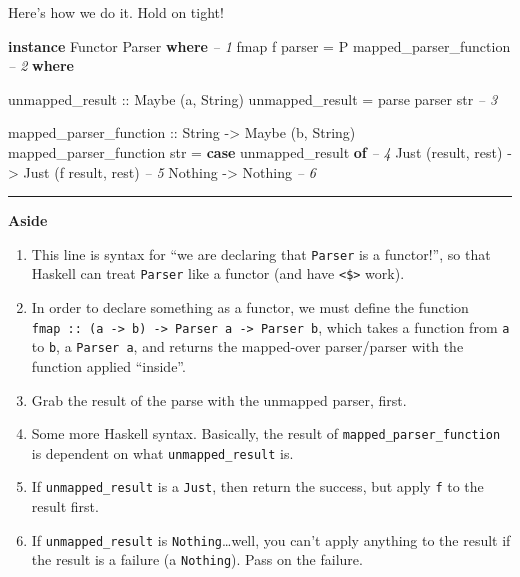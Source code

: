 \documentclass[]{article}
\newenvironment{Shaded}{}{}
\newcommand{\KeywordTok}[1]{\textcolor[rgb]{0.00,0.44,0.13}{\textbf{{#1}}}}
\newcommand{\DataTypeTok}[1]{\textcolor[rgb]{0.56,0.13,0.00}{{#1}}}
\newcommand{\CommentTok}[1]{\textcolor[rgb]{0.38,0.63,0.69}{\textit{{#1}}}}
\newcommand{\OtherTok}[1]{\textcolor[rgb]{0.00,0.44,0.13}{{#1}}}
\newcommand{\FunctionTok}[1]{\textcolor[rgb]{0.02,0.16,0.49}{{#1}}}
\newcommand{\NormalTok}[1]{{#1}}
\begin{document}
Here's how we do it. Hold on tight!

\begin{Shaded}
\begin{Highlighting}[]
\KeywordTok{instance} \DataTypeTok{Functor} \DataTypeTok{Parser} \KeywordTok{where}                                       \CommentTok{-- 1}
    \NormalTok{fmap f parser }\FunctionTok{=} \DataTypeTok{P} \NormalTok{mapped_parser_function                        }\CommentTok{-- 2}
        \KeywordTok{where}

\OtherTok{            unmapped_result ::} \DataTypeTok{Maybe} \NormalTok{(a, }\DataTypeTok{String}\NormalTok{)}
            \NormalTok{unmapped_result }\FunctionTok{=} \NormalTok{parse parser str                      }\CommentTok{-- 3}

\OtherTok{            mapped_parser_function ::} \DataTypeTok{String} \OtherTok{->} \DataTypeTok{Maybe} \NormalTok{(b, }\DataTypeTok{String}\NormalTok{)}
            \NormalTok{mapped_parser_function str }\FunctionTok{=}
                \KeywordTok{case} \NormalTok{unmapped_result }\KeywordTok{of}                             \CommentTok{-- 4}
                    \DataTypeTok{Just} \NormalTok{(result, rest) }\OtherTok{->} \DataTypeTok{Just} \NormalTok{(f result, rest)    }\CommentTok{-- 5}
                    \DataTypeTok{Nothing}             \OtherTok{->} \DataTypeTok{Nothing}                  \CommentTok{-- 6}
\end{Highlighting}
\end{Shaded}

\begin{center}\rule{0.5\linewidth}{\linethickness}\end{center}

\textbf{Aside}

\begin{enumerate}
\def\labelenumi{\arabic{enumi}.}
\tightlist
\item
  This line is syntax for ``we are declaring that \texttt{Parser} is a
  functor!'', so that Haskell can treat \texttt{Parser} like a functor (and have
  \texttt{\textless{}\$\textgreater{}} work).
\item
  In order to declare something as a functor, we must define the function
  \texttt{fmap\ ::\ (a\ -\textgreater{}\ b)\ -\textgreater{}\ Parser\ a\ -\textgreater{}\ Parser\ b},
  which takes a function from \texttt{a} to \texttt{b}, a \texttt{Parser\ a},
  and returns the mapped-over parser/parser with the function applied
  ``inside''.
\item
  Grab the result of the parse with the unmapped parser, first.
\item
  Some more Haskell syntax. Basically, the result of
  \texttt{mapped\_parser\_function} is dependent on what
  \texttt{unmapped\_result} is.
\item
  If \texttt{unmapped\_result} is a \texttt{Just}, then return the success, but
  apply \texttt{f} to the result first.
\item
  If \texttt{unmapped\_result} is \texttt{Nothing}\ldots{}well, you can't apply
  anything to the result if the result is a failure (a \texttt{Nothing}). Pass
  on the failure.
\end{enumerate}
\end{document}
